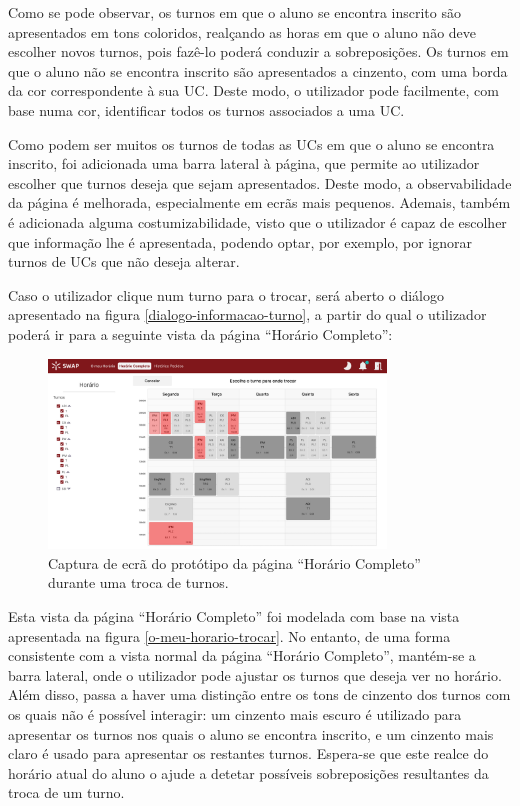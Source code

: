 \documentclass[12pt, a4paper]{article}
\begin{document}
Como se pode observar, os turnos em que o aluno se encontra inscrito são apresentados em tons
coloridos, realçando as horas em que o aluno não deve escolher novos turnos, pois fazê-lo poderá
conduzir a sobreposições. Os turnos em que o aluno não se encontra inscrito são apresentados a
cinzento, com uma borda da cor correspondente à sua UC. Deste modo, o utilizador pode facilmente,
com base numa cor, identificar todos os turnos associados a uma UC.

Como podem ser muitos os turnos de todas as UCs em que o aluno se encontra inscrito, foi adicionada
uma barra lateral à página, que permite ao utilizador escolher que turnos deseja que sejam
apresentados. Deste modo, a observabilidade da página é melhorada, especialmente em ecrãs mais
pequenos. Ademais, também é adicionada alguma costumizabilidade, visto que o utilizador é capaz de
escolher que informação lhe é apresentada, podendo optar, por exemplo, por ignorar turnos de UCs
que não deseja alterar.

Caso o utilizador clique num turno para o trocar, será aberto o diálogo apresentado na figura
\ref{dialogo-informacao-turno}, a partir do qual o utilizador poderá ir para a seguinte vista da
página ``Horário Completo'':

\begin{figure}[H]
    \centering
    \includegraphics[width=0.8\textwidth]{res/prototype/horario-completo-trocar.png}
    \caption{
        \onehalfspacing
        Captura de ecrã do protótipo da página ``Horário Completo'' durante uma troca de turnos.
    }
    \label{horario-completo-trocar}
\end{figure}

Esta vista da página ``Horário Completo'' foi modelada com base na vista apresentada na figura
\ref{o-meu-horario-trocar}. No entanto, de uma forma consistente com a vista normal da página
``Horário Completo'', mantém-se a barra lateral, onde o utilizador pode ajustar os turnos que deseja
ver no horário. Além disso, passa a haver uma distinção entre os tons de cinzento dos turnos com os
quais não é possível interagir: um cinzento mais escuro é utilizado para apresentar os turnos nos
quais o aluno se encontra inscrito, e um cinzento mais claro é usado para apresentar os restantes
turnos. Espera-se que este realce do horário atual do aluno o ajude a detetar possíveis
sobreposições resultantes da troca de um turno.
\end{document}
